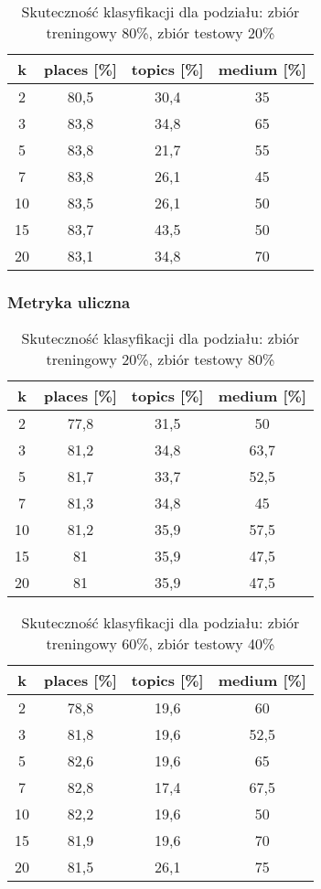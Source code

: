 \documentclass{classrep}
\begin{document}
\begin{table}[H]
	\centering
	\begin{tabular}{c c c c} 
		\hline
		\textbf{k} & \textbf{places [\%]} & \textbf{topics [\%]} &  \textbf{medium [\%]} \\ [0.5ex] 
		\hline
		\hline 
2 & 80,5 & 30,4 & 35 \\ 
3 & 83,8 & 34,8 & 65 \\ 
5 & 83,8 & 21,7 & 55 \\ 
7 & 83,8 & 26,1 & 45 \\ 
10 & 83,5 & 26,1 & 50 \\ 
15 & 83,7 & 43,5 & 50 \\ 
20 & 83,1 & 34,8 & 70 \\ 
		\hline
	\end{tabular}
	\caption{Skuteczność klasyfikacji dla podziału: zbiór treningowy 80\%, zbiór testowy 20\%}
\end{table}

\subsubsection{Metryka uliczna}
\begin{table}[H]
	\centering
	\begin{tabular}{c c c c} 
		\hline
		\textbf{k} & \textbf{places [\%]} & \textbf{topics [\%]} &  \textbf{medium [\%]} \\ [0.5ex] 
		\hline
		\hline 
2 & 77,8 & 31,5 & 50 \\ 
3 & 81,2 & 34,8 & 63,7 \\ 
5 & 81,7 & 33,7 & 52,5 \\ 
7 & 81,3 & 34,8 & 45 \\ 
10 & 81,2 & 35,9 & 57,5 \\ 
15 & 81 & 35,9 & 47,5 \\ 
20 & 81 & 35,9 & 47,5 \\ 
		\hline
	\end{tabular}
	\caption{Skuteczność klasyfikacji dla podziału: zbiór treningowy 20\%, zbiór testowy 80\%}
\end{table}

\begin{table}[H]
	\centering
	\begin{tabular}{c c c c} 
		\hline
		\textbf{k} & \textbf{places [\%]} & \textbf{topics [\%]} &  \textbf{medium [\%]} \\ [0.5ex] 
		\hline
		\hline 
2 & 78,8 & 19,6 & 60 \\ 
3 & 81,8 & 19,6 & 52,5 \\ 
5 & 82,6 & 19,6 & 65 \\ 
7 & 82,8 & 17,4 & 67,5 \\ 
10 & 82,2 & 19,6 & 50 \\ 
15 & 81,9 & 19,6 & 70 \\ 
20 & 81,5 & 26,1 & 75 \\ 
		\hline
	\end{tabular}
	\caption{Skuteczność klasyfikacji dla podziału: zbiór treningowy 60\%, zbiór testowy 40\%}
\end{table}
\end{document}
